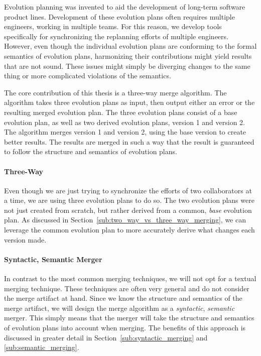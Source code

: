 \documentclass[a4paper,english]{ifimaster}
\begin{document}
Evolution planning was invented to aid the development of long-term software product lines. Development of these evolution plans often requires multiple engineers, working in multiple teams. For this reason, we develop tools specifically for synchronizing the replanning efforts of multiple engineers. However, even though the individual evolution plans are conforming to the formal semantics of evolution plans, harmonizing their contributions might yield results that are not sound. These issues might simply be diverging changes to the same thing or more complicated violations of the semantics.

The core contribution of this thesis is a three-way merge algorithm. The algorithm takes three evolution plans as input, then output either an error or the resulting merged evolution plan. The three evolution plans consist of a base evolution plan, as well as two derived evolution plans, version 1 and version 2. The algorithm merges version 1 and version 2, using the base version to create better results. The results are merged in such a way that the result is guaranteed to follow the structure and semantics of evolution plans.

\paragraph{Three-Way}%
\label{par:three_way}

Even though we are just trying to synchronize the efforts of two collaborators at a time, we are using three evolution plans to do so. The two evolution plans were not just created from scratch, but rather derived from a common, \textit{base} evolution plan. As discussed in Section~\vref{sub:two_way_vs_three_way_merging}, we can leverage the common evolution plan to more accurately derive what changes each version made.

\paragraph{Syntactic, Semantic Merger}%
\label{par:semantic_merger}

In contrast to the most common merging techniques, we will not opt for a textual merging technique. These techniques are often very general and do not consider the merge artifact at hand. Since we know the structure and semantics of the merge artifact, we will design the merge algorithm as a \textit{syntactic}, \textit{semantic} merger. This simply means that the merger will take the structure and semantics of evolution plans into account when merging. The benefits of this approach is discussed in greater detail in Section~\vref{sub:syntactic_merging} and \vref{sub:semantic_merging}.
\end{document}
